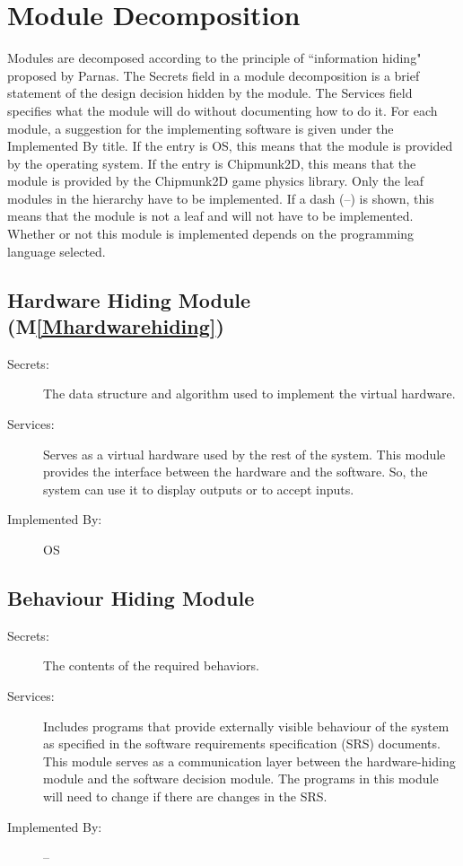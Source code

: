 \documentclass[12pt]{article}
\begin{document}
\section{Module Decomposition}
\label{Sec:MD}
Modules are decomposed according to the principle of ``information hiding" proposed by Parnas. The Secrets field in a module decomposition is a brief statement of the design decision hidden by the module. The Services field specifies what the module will do without documenting how to do it. For each module, a suggestion for the implementing software is given under the Implemented By title. If the entry is OS, this means that the module is provided by the operating system. If the entry is Chipmunk2D, this means that the module is provided by the Chipmunk2D game physics library. Only the leaf modules in the hierarchy have to be implemented. If a dash (--) is shown, this means that the module is not a leaf and will not have to be implemented. Whether or not this module is implemented depends on the programming language selected.
\subsection{Hardware Hiding Module (M\ref{Mhardwarehiding})}
\label{Sec:HHM()}
\begin{description}
\item[Secrets:]The data structure and algorithm used to implement the virtual hardware.
\item[Services:]Serves as a virtual hardware used by the rest of the system. This module provides the interface between the hardware and the software. So, the system can use it to display outputs or to accept inputs.
\item[Implemented By:]OS
\end{description}
\subsection{Behaviour Hiding Module}
\label{Sec:BHM}
\begin{description}
\item[Secrets:]The contents of the required behaviors.
\item[Services:]Includes programs that provide externally visible behaviour of the system as specified in the software requirements specification (SRS) documents. This module serves as a communication layer between the hardware-hiding module and the software decision module. The programs in this module will need to change if there are changes in the SRS.
\item[Implemented By:]--
\end{description}
\end{document}
